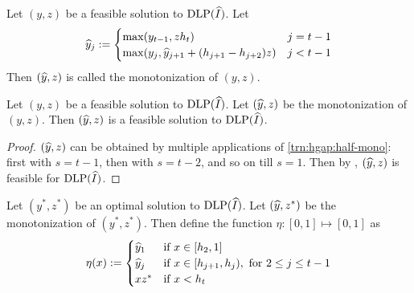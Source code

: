 \begin{definition}
Let $(y, z)$ be a feasible solution to $\operatorname{DLP}(\widehat{I})$. Let
\[ \widehat{y}_j := \begin{cases}
\max(y_{t-1}, zh_t) & j = t-1
\\ \max(y_j, \widehat{y}_{j+1} + (h_{j+1} - h_{j+2})z) & j < t-1
\end{cases} \]
Then $(\widehat{y}, z)$ is called the monotonization of $(y, z)$.
\end{definition}
\begin{lemma}
\label{thm:hgap:mono-feas}
Let $(y, z)$ be a feasible solution to $\operatorname{DLP}(\widehat{I})$.
Let $(\widehat{y}, z)$ be the monotonization of $(y, z)$.
Then $(\widehat{y}, z)$ is a feasible solution to $\operatorname{DLP}(\widehat{I})$.
\end{lemma}
\begin{proof}
$(\widehat{y}, z)$ can be obtained by multiple applications of \cref{trn:hgap:half-mono}:
first with $s = t-1$, then with $s = t-2$, and so on till $s = 1$.
Then by , $(\widehat{y}, z)$ is feasible for $\operatorname{DLP}(\widehat{I})$.
\end{proof}

Let $(y^*, z^*)$ be an optimal solution to $\operatorname{DLP}(\widehat{I})$.
Let $(\widehat{y}, z^*)$ be the monotonization of $(y^*, z^*)$.
Then define the function $\eta: [0, 1] \mapsto [0, 1]$ as
\[ \eta(x) := \begin{cases}
\widehat{y}_1 & \textrm{if } x \in [h_2, 1]
\\ \widehat{y}_j & \textrm{if } x \in [h_{j+1}, h_j), \textrm{ for } 2 \le j \le t-1
\\ xz^* & \textrm{if } x < h_t
\end{cases} \]

